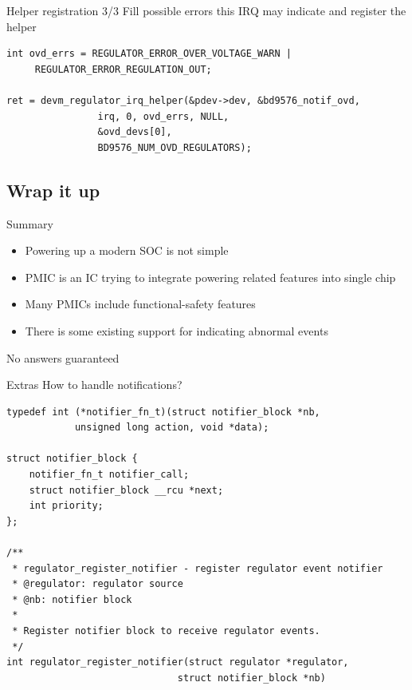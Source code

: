 \documentclass[aspectratio=169]{beamer}
\begin{document}
\begin{frame}[fragile, t]{Helper registration 3/3}\vspace{4pt}
Fill possible errors this IRQ may indicate and register the helper
\vfill
{}
\scriptsize

\begin{lstlisting}
int ovd_errs = REGULATOR_ERROR_OVER_VOLTAGE_WARN |
	 REGULATOR_ERROR_REGULATION_OUT;

ret = devm_regulator_irq_helper(&pdev->dev, &bd9576_notif_ovd,
				irq, 0, ovd_errs, NULL,
				&ovd_devs[0],
				BD9576_NUM_OVD_REGULATORS);

\end{lstlisting}
\end{frame}


\addtocounter{framenumber}{-1}
\begin{frame}[plain]
\section{Wrap it up}
\end{frame}

\begin{frame}{Summary}
\begin{itemize}
	\item Powering up a modern SOC is not simple
	\item PMIC is an IC trying to integrate powering related features into single chip
	\item Many PMICs include functional-safety features
	\item There is some existing support for indicating abnormal events
\end{itemize}
\end{frame}

\begin{frame}{No answers guaranteed}
\center
{}
\end{frame}

\addtocounter{framenumber}{-1}
\begin{frame}{Extras}
\lstset{language=C}
\scriptsize
How to handle notifications?
\begin{lstlisting}
typedef int (*notifier_fn_t)(struct notifier_block *nb,
			unsigned long action, void *data);

struct notifier_block {
	notifier_fn_t notifier_call;
	struct notifier_block __rcu *next;
	int priority;
};

/**
 * regulator_register_notifier - register regulator event notifier
 * @regulator: regulator source
 * @nb: notifier block
 *
 * Register notifier block to receive regulator events.
 */
int regulator_register_notifier(struct regulator *regulator,
                              struct notifier_block *nb) 
\end{lstlisting}
\end{frame}
\end{document}
